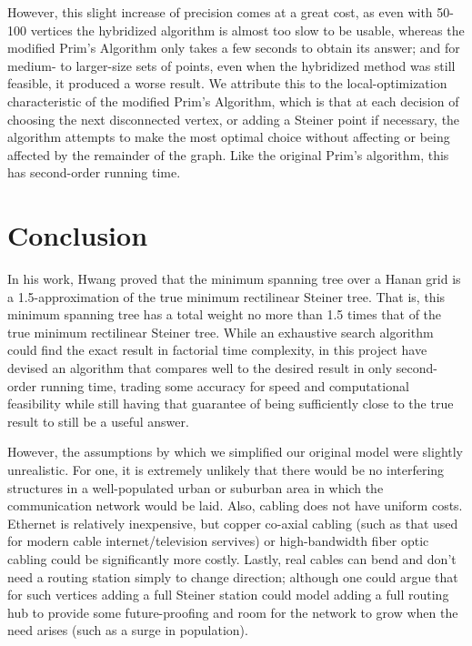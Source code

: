 \documentclass[12pt,letterpaper]{article}
\theoremstyle{definition}\newtheorem{defn}[defncounter]{Definition}
\theoremstyle{remark}\newtheorem*{remark}{Remark}
\begin{document}
However, this slight increase of precision comes at a great cost, as even with 50-100 vertices the hybridized algorithm is almost 
too slow to be usable, whereas the modified Prim's Algorithm only takes a few seconds to obtain its answer; and for medium- to 
larger-size sets of points, even when the hybridized method was still feasible, it produced a worse result. We attribute this to 
the local-optimization characteristic of the modified Prim's Algorithm, which is that at each decision of choosing the next 
disconnected vertex, or adding a Steiner point if necessary, the algorithm attempts to make the most optimal choice without 
affecting or being affected by the remainder of the graph. Like the original Prim's algorithm, this has second-order running time.

\section{Conclusion}

In his work, Hwang proved that the minimum spanning tree over a Hanan grid is a 1.5-approximation of the true minimum rectilinear 
Steiner tree. That is, this minimum spanning tree has a total weight no more than 1.5 times that of the true minimum rectilinear 
Steiner tree. While an exhaustive search algorithm could find the exact result in factorial time complexity, in this project have 
devised an algorithm that compares well to the desired result in only second-order running time, trading some accuracy for speed and 
computational feasibility while still having that guarantee of being sufficiently close to the true result to still be a useful answer.

However, the assumptions by which we simplified our original model were slightly unrealistic. For one, it is extremely unlikely 
that there would be no interfering structures in a well-populated urban or suburban area in which the communication network would 
be laid. Also, cabling does not have uniform costs. Ethernet is relatively inexpensive, but copper co-axial cabling (such as that 
used for modern cable internet/television servives) or high-bandwidth fiber optic cabling could be significantly more costly. 
Lastly, real cables can bend and don't need a routing station simply to change direction; although one could argue that for such 
vertices adding a full Steiner station could model adding a full routing hub to provide some future-proofing and room for the 
network to grow when the need arises (such as a surge in population).
\end{document}
